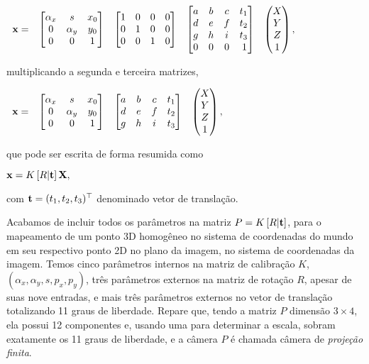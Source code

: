 \begin{center}
$
\begin{array}{ccccc}
\mathbf{x}=
&
\begin{bmatrix}
\alpha_x&s&x_0\\
0&\alpha_y&y_0\\
0&0&1
\end{bmatrix}&
\begin{bmatrix}
1&0&0&0\\
0&1&0&0\\
0&0&1&0
\end{bmatrix}
&
\begin{bmatrix}
a&b&c&t_1\\
d&e&f&t_2\\
g&h&i&t_3\\
0&0&0&\,1
\end{bmatrix}
&
\begin{pmatrix}
X\\
Y\\
Z\\
1
\end{pmatrix},
\end{array}
$
\end{center}
multiplicando a segunda e terceira matrizes,
\begin{center}
$
\begin{array}{cccc}
\mathbf{x}=
&
\begin{bmatrix}
\alpha_x&s&x_0\\
0&\alpha_y&y_0\\
0&0&1
\end{bmatrix}&
\begin{bmatrix}
a&b&c&t_1\\
d&e&f&t_2\\
g&h&i&t_3
\end{bmatrix}
&
\begin{pmatrix}
X\\
Y\\
Z\\
1
\end{pmatrix},
\end{array}
$
\end{center}
que pode ser escrita de forma resumida como
\begin{center}
$
\mathbf{x}=K\,[R|{\bf t}]\,\mathbf{X},
$
\end{center}
com ${\bf t}=(t_1,t_2,t_3)^\top$ denominado vetor de translação.

Acabamos de incluir todos os parâmetros na matriz $P=K\,[R|{\bf t}]$, para o mapeamento de um ponto 3D homogêneo no sistema de coordenadas do mundo em seu respectivo ponto 2D no plano da imagem, no sistema de coordenadas da imagem. Temos cinco parâmetros internos na matriz de calibração $K$, $(\alpha_x,\alpha_y,s,p_x,p_y)$, três parâmetros externos na matriz de rotação $R$, apesar de suas nove entradas, e mais três parâmetros externos no vetor de translação totalizando 11 graus de liberdade. Repare que, tendo a matriz $P$ dimensão $3\times4$, ela possui 12 componentes e, usando uma para determinar a escala, sobram exatamente os 11 graus de liberdade, e a câmera $P$ é chamada câmera de \textit{projeção finita}.

